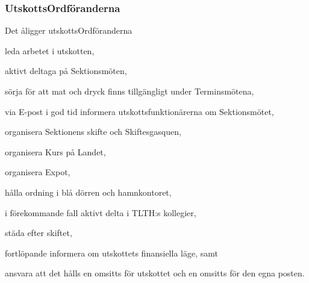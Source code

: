 \documentclass[10pt]{article}
\begin{document}
\subsubsection{UtskottsOrdföranderna}
Det åligger utskottsOrdföranderna
\begin{attlist}
    \item leda arbetet i utskotten,
    \item aktivt deltaga på Sektionsmöten,
    \item sörja för att mat och dryck finns tillgängligt under Terminsmötena,
    \item via E-post i god tid informera utskottsfunktionärerna om Sektionsmötet,
    \item organisera Sektionens skifte och Skiftesgasquen,
    \item organisera Kurs på Landet,
    \item organisera Expot,
    \item hålla ordning i blå dörren och hamnkontoret,
    \item i förekommande fall aktivt delta i TLTH:s kollegier,
    \item städa efter skiftet,
    \item fortlöpande informera om utskottets finansiella läge, samt
    \item ansvara att det hålls en omsitts för utskottet och en omsitts för den egna posten.
\end{attlist}
\end{document}
